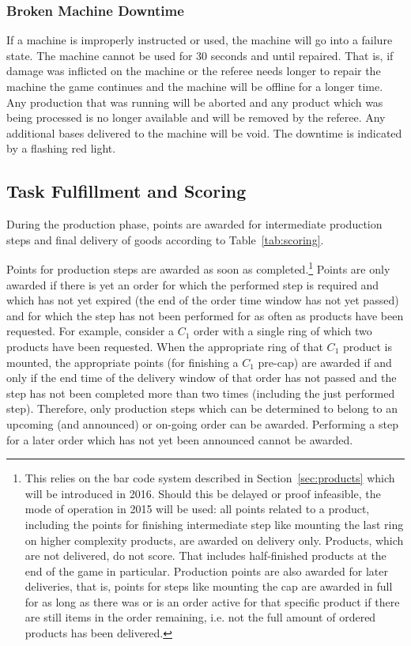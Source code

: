 \documentclass[12pt,twoside]{article}
\newcommand{\refsec}[1]{Section~\ref{#1}}
\newcommand{\reftab}[1]{Table~\ref{#1}}
\begin{document}
\subsubsection{Broken Machine Downtime}
\label{sec:broken-machine}
If a machine is improperly instructed or used, the machine will go
into a failure state. The machine cannot be used for 30 seconds and
until repaired. That is, if damage was inflicted on the machine or the
referee needs longer to repair the machine the game continues and the
machine will be offline for a longer time. Any production that was
running will be aborted and any product which was being processed is
no longer available and will be removed by the referee. Any additional
bases delivered to the machine will be void. The downtime is indicated
by a flashing red light.

\subsection{Task Fulfillment and Scoring}
\label{sec:production-scoring}
During the production phase, points are awarded for intermediate
production steps and final delivery of goods according to
\reftab{tab:scoring}.

Points for production steps are awarded as soon as
completed.\footnote{This relies on the bar code system described in
  \refsec{sec:products} which will be introduced in 2016. Should this
  be delayed or proof infeasible, the mode of operation in 2015 will
  be used: all points related to a product, including the points for
  finishing intermediate step like mounting the last ring on higher
  complexity products, are awarded on delivery only. Products, which
  are not delivered, do not score. That includes half-finished
  products at the end of the game in particular. Production points are
  also awarded for later deliveries, that is, points for steps like
  mounting the cap are awarded in full for as long as there was or is
  an order active for that specific product if there are still items
  in the order remaining, i.e. not the full amount of ordered products
  has been delivered.}
%
Points are only awarded if there is yet an order for which the
performed step is required and which has not yet expired (the end of
the order time window has not yet passed) and for which the step has
not been performed for as often as products have been requested. For
example, consider a $C_1$ order with a single ring of which two
products have been requested. When the appropriate ring of that $C_1$
product is mounted, the appropriate points (for finishing a $C_1$
pre-cap) are awarded if and only if the end time of the delivery
window of that order has not passed and the step has not been
completed more than two times (including the just performed
step). Therefore, only production steps which can be determined to
belong to an upcoming (and announced) or on-going order can be
awarded. Performing a step for a later order which has not yet been
announced cannot be awarded.
\end{document}

